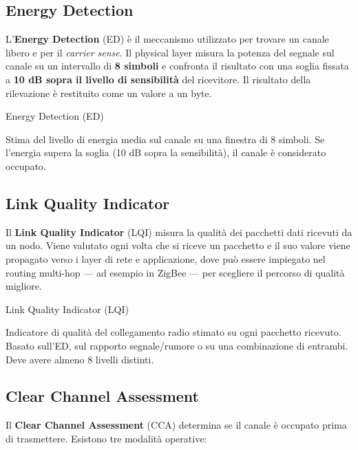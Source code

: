 \documentclass[
  italian,
  openany]{book}
\begin{document}
\subsection{Energy Detection}\label{energy-detection}

L'\textbf{Energy Detection} (ED) è il meccanismo utilizzato per trovare
un canale libero e per il \emph{carrier sense}. Il physical layer misura
la potenza del segnale sul canale su un intervallo di \textbf{8 simboli}
e confronta il risultato con una soglia fissata a \textbf{10 dB sopra il
livello di sensibilità} del ricevitore. Il risultato della rilevazione è
restituito come un valore a un byte.

\begin{calloutdefinition}{Energy Detection (ED)}

Stima del livello di energia media sul canale su una finestra di 8
simboli. Se l'energia supera la soglia (10 dB sopra la sensibilità), il
canale è considerato occupato.

\end{calloutdefinition}

\subsection{Link Quality Indicator}\label{link-quality-indicator}

Il \textbf{Link Quality Indicator} (LQI) misura la qualità dei pacchetti
dati ricevuti da un nodo. Viene valutato ogni volta che si riceve un
pacchetto e il suo valore viene propagato verso i layer di rete e
applicazione, dove può essere impiegato nel routing multi-hop --- ad
esempio in ZigBee --- per scegliere il percorso di qualità migliore.

\begin{calloutdefinition}{Link Quality Indicator (LQI)}

Indicatore di qualità del collegamento radio stimato su ogni pacchetto
ricevuto. Basato sull'ED, sul rapporto segnale/rumore o su una
combinazione di entrambi. Deve avere almeno 8 livelli distinti.

\end{calloutdefinition}

\subsection{Clear Channel Assessment}\label{clear-channel-assessment}

Il \textbf{Clear Channel Assessment} (CCA) determina se il canale è
occupato prima di trasmettere. Esistono tre modalità operative:
\end{document}
